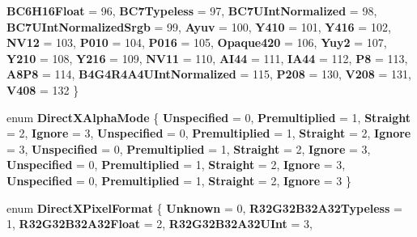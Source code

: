 \begin{DoxyCompactItemize}
\newline
{\bfseries B\+C6\+H16\+Float} = 96, 
{\bfseries B\+C7\+Typeless} = 97, 
{\bfseries B\+C7\+U\+Int\+Normalized} = 98, 
{\bfseries B\+C7\+U\+Int\+Normalized\+Srgb} = 99, 
\newline
{\bfseries Ayuv} = 100, 
{\bfseries Y410} = 101, 
{\bfseries Y416} = 102, 
{\bfseries N\+V12} = 103, 
\newline
{\bfseries P010} = 104, 
{\bfseries P016} = 105, 
{\bfseries Opaque420} = 106, 
{\bfseries Yuy2} = 107, 
\newline
{\bfseries Y210} = 108, 
{\bfseries Y216} = 109, 
{\bfseries N\+V11} = 110, 
{\bfseries A\+I44} = 111, 
\newline
{\bfseries I\+A44} = 112, 
{\bfseries P8} = 113, 
{\bfseries A8\+P8} = 114, 
{\bfseries B4\+G4\+R4\+A4\+U\+Int\+Normalized} = 115, 
\newline
{\bfseries P208} = 130, 
{\bfseries V208} = 131, 
{\bfseries V408} = 132
 \}
\item 
\mbox{\label{namespace_windows_1_1_graphics_1_1_direct_x_af123b0bc9a4738d81ccfc0ea3154e8d2}} 
enum {\bfseries Direct\+X\+Alpha\+Mode} \{ \newline
{\bfseries Unspecified} = 0, 
{\bfseries Premultiplied} = 1, 
{\bfseries Straight} = 2, 
{\bfseries Ignore} = 3, 
\newline
{\bfseries Unspecified} = 0, 
{\bfseries Premultiplied} = 1, 
{\bfseries Straight} = 2, 
{\bfseries Ignore} = 3, 
\newline
{\bfseries Unspecified} = 0, 
{\bfseries Premultiplied} = 1, 
{\bfseries Straight} = 2, 
{\bfseries Ignore} = 3, 
\newline
{\bfseries Unspecified} = 0, 
{\bfseries Premultiplied} = 1, 
{\bfseries Straight} = 2, 
{\bfseries Ignore} = 3, 
\newline
{\bfseries Unspecified} = 0, 
{\bfseries Premultiplied} = 1, 
{\bfseries Straight} = 2, 
{\bfseries Ignore} = 3
 \}
\item 
\mbox{\label{namespace_windows_1_1_graphics_1_1_direct_x_a842a48af0a06e5cee12c38f8c99fbdce}} 
enum {\bfseries Direct\+X\+Pixel\+Format} \{ \newline
{\bfseries Unknown} = 0, 
{\bfseries R32\+G32\+B32\+A32\+Typeless} = 1, 
{\bfseries R32\+G32\+B32\+A32\+Float} = 2, 
{\bfseries R32\+G32\+B32\+A32\+U\+Int} = 3, 
\newline

\end{DoxyCompactItemize}
